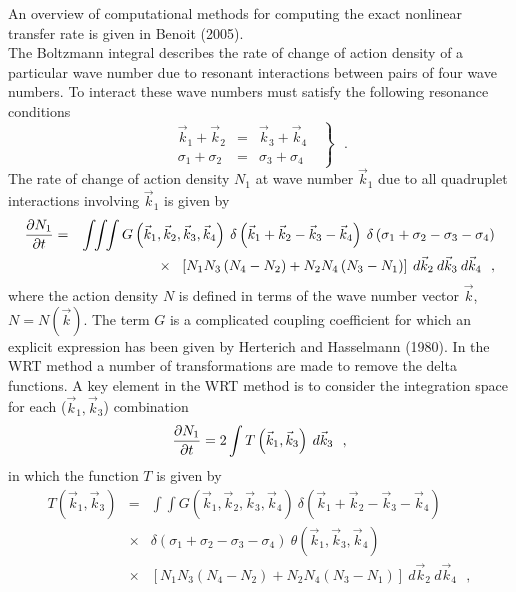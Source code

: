 \documentclass[12pt]{book}
\begin{document}
An overview of computational methods for computing the exact nonlinear
transfer rate is given in Benoit (2005).
\nocite{Has62,Has63a,Has63b,Web78,Tra82R,Res91P,Vle06,Ben05}
\\[2ex]
\noindent
The Boltzmann integral describes the rate of change of action density
of a particular wave number due to resonant interactions between pairs
of four wave numbers. To interact these wave numbers must satisfy the
following resonance conditions
\begin{equation}
\left .
\begin{array}{ccc}
  \vec{k}_1 + \vec{k}_2 & = & \vec{k}_3 + \vec{k}_4 \\
  \sigma_1 + \sigma_2  & = & \sigma_3 + \sigma_4
\end{array} \:\:\: \right \rbrace \:\:\: .
\label{eq:resonance_2}
\end{equation}
The rate of change of action density $N_1 $ at
wave number $\vec{k}_1$ due to all quadruplet interactions involving
$\vec{k}_1$ is given by
\begin{eqnarray}
\frac{{\partial N_1 }}{{\partial t}} & = & \int\!\!\int\!\!\int G\left( \vec{k}_1
,\vec{k}_2 ,\vec{k}_3 ,\vec{k}_4 \right ) \: \delta \left( \vec{k}_1  + \vec{k}_2  - \vec{k}_3
- \vec{k}_4 \right)
\: \delta \left( {\sigma _1  + \sigma _2  - \sigma _3  - \sigma _4 }
\right) \nonumber \\  & &
\hspace{7mm}\times \:\:\: \left[ {N_1 N_3 \left( {N_4  - N_2 } \right)
+ N_2 N_4 \left(
{N_3  - N_1 } \right)} \right] \: d\vec{k}_2 \: d\vec{k}_3 \: d\vec{k}_4 \:\:\: ,
\end{eqnarray}
where the action density $N$ is defined in terms of the wave number
vector $\vec{k}$, $N = N(\vec{k})$. The term $G$ is a complicated coupling
coefficient for which an explicit expression has been given by Herterich and Hasselmann (1980).
In the WRT method a number of transformations are
made to remove the delta functions. A key element in the WRT method
is to consider the integration space for each ($\vec{k}_1 ,\vec{k}_3$)
combination
\begin{equation}
{{\partial N_1 } \over {\partial t}} = 2\int T\left( {\vec{k}_1 ,\vec{k}_3 }
\right) \: d\vec{k}_3  \:\:\: ,
\end{equation}
in which the function $T$ is given by
\begin{eqnarray}
T \left( \vec{k}_1 ,\vec{k}_3 \right) & = & \int\!\!\int
G\left( \vec{k}_1 ,\vec{k}_2, \vec{k}_3 ,\vec{k}_4 \right) \: \delta \left( \vec{k}_1  +
\vec{k}_2  - \vec{k}_3  - \vec{k}_4 \right) \nonumber \\
& \times & \delta \left( {\sigma _1  + \sigma _2  - \sigma _3  -
\sigma _4 }
\right) \: \theta \left ( \vec{k}_1 , \vec{k}_3 , \vec{k}_4 \right )
\nonumber \\
& \times & \left [ N_1 N_3 \left ( N_4 - N_2 \right ) + N_2 N_4 \left
(
N_3  - N_1 \right ) \right ] \: d\vec{k}_2 \: d\vec{k}_4 \:\:\: ,
\label{eq:WRT_T}
\end{eqnarray}
\end{document}
